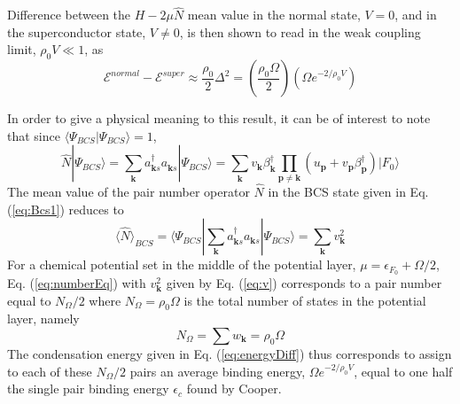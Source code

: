 \documentclass[aps,prb,preprint,groupedaddress,amsmath]{revtex4-1}
\newcommand{\vp}{\ensuremath{\mathbf{p}}}
\newcommand{\vk}{\ensuremath{\mathbf{k}}}
\newcommand{\dg}{\ensuremath{\dagger}}
\begin{document}
Difference between the $H-2\mu\hat{N}$ mean value in the normal state, $V=0$, and in the superconductor state, $V\neq0$, is then shown to read in the weak coupling limit, $\rho_0V\ll1$, as
\begin{equation}\label{eq:energyDiff}
\mathcal{E}^{normal}-\mathcal{E}^{super}\approx\frac{\rho_0}{2}\Delta^2=(\frac{\rho_0\Omega}{2})(\Omega{}e^{-2/\rho_0V})
\end{equation}

In order to give a physical meaning to this result, it can be of interest to note that  since $\langle\Psi_{BCS}|\Psi_{BCS}\rangle=1$, 
\begin{equation}
{\hat{N}}|\Psi_{BCS}{\rangle}=\sum_\vk{a^\dg_{\vk{}s}{}a^{}_{\vk{}s}}|\Psi_{BCS}{\rangle}
=\sum_\vk{}v_\vk\beta^\dg_\vk\prod_{\vp\neq\vk}(u_\vp+v_\vp\beta^\dg_\vp)|F_0{\rangle}
\end{equation}
The  mean value of the pair number operator $\hat{N}$ in the BCS state given in Eq. (\ref{eq:Bcs1}) reduces to
\begin{equation}\label{eq:numberEq}
\langle{\hat{N}}{\rangle}_{BCS}={\langle\Psi_{BCS}|\sum_\vk{a^\dg_{\vk{}s}{}a^{}_{\vk{}s}}|\Psi_{BCS}{\rangle}}
=\sum_\vk{v_\vk^2}
\end{equation}
For a chemical potential set in the middle of the potential layer,
 $\mu=\epsilon_{F_0}+\Omega/2$, Eq. (\ref{eq:numberEq}) with $v_\vk^2$ given by Eq. (\ref{eq:v}) corresponds to  a pair number  equal to $N_\Omega/2$ where $N_{\Omega}=\rho_0\Omega$ is the total number of states  in the potential layer, namely 
\begin{equation}
 N_\Omega=\sum{w_\vk}=\rho_0\Omega
\end{equation}
 The  condensation energy given in Eq. (\ref{eq:energyDiff}) thus corresponds to assign to each of these $N_\Omega/2$ pairs  an average binding energy, $\Omega{}e^{-2/\rho_0V}$, equal to one half the single pair binding energy $\epsilon_c$ found by Cooper. 
\end{document}
